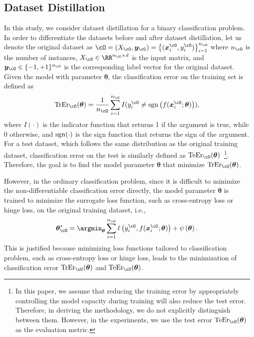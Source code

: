 \subsection{Dataset Distillation}
\label{subsec:dataset_distillation}
%

In this study, we consider dataset distillation for a binary classification problem.
%
In order to differentiate the datasets before and after dataset distillation, let us denote the original dataset as $\cO = \left(X_{\cO}, \bm y_{\cO}\right) = \left\{(\bm x_i^{\cO}, y_i^{\cO}) \right\}_{i=1}^{n_{\cO}}$ where $n_{\cO}$ is the number of instances, $X_\cO \in \RR^{n_{\cO} \times d}$ is the input matrix, and $\bm y_{\cO} \in \{-1, +1\}^{n_{\cO}}$ is the corresponding label vector for the original dataset.
%
Given the model with parameter $\bm \theta$, the classification error on the training set is defined as 
\begin{equation*}
 {\rm TrEr}_\cO(\bm \theta)
 =
 \frac{1}{n_\cO}
 \sum_{i=1}^{n_\cO}
 I(y^\cO_i \neq {\rm sgn}\left( f(\bm x^\cO_i; \bm \theta)\right)),
\end{equation*}
where $I(\cdot)$ is the indicator function that returns 1 if the argument is true, while 0 otherwise, and ${\rm sgn}(\cdot)$ is the sign function that returns the sign of the argument.
%
For a test dataset, which follows the same distribution as the original training dataset, classification error on the test is similarly defined as ${\rm TeEr}_\cO(\bm \theta)$~\footnote{
%
In this paper, we assume that reducing the training error by appropriately controlling the model capacity during training will also reduce the test error. Therefore, in deriving the methodology, we do not explicitly distinguish between them. However, in the experiments, we use the test error \({\rm TeEr}_\cO(\bm \theta)\) as the evaluation metric.
%
}.
%
Therefore, the goal is to find the model parameter $\bm \theta$ that minimize ${\rm TrEr}_{\cO}(\bm \theta)$.%



However, in the ordinary classification problem, since it is difficult to minimize the non-differentiable classification error directly, the model parameter $\bm{\theta}$ is trained to minimize the surrogate loss function, such as cross-entropy loss or hinge loss, on the original training dataset, i.e.,
\begin{equation}
 \bm \theta_{\cO}^*
 =
 \argmin_{\bm \theta}
 \sum_{i=1}^{n_{\cO}}
 \ell
 \left(
 y^{\cO}_i, f(\bm x^{\cO}_i; \bm \theta)
 \right)
 +
 \psi\left(\bm \theta\right).
\label{eq:theta_o-opt}
\end{equation}
%
This is justified because minimizing loss functions tailored to classification problem, such as cross-entropy loss or hinge loss, leads to the minimization of classification error ${\rm TrEr}_{\cO}(\bm \theta)$ and ${\rm TeEr}_{\cO}(\bm \theta)$.




